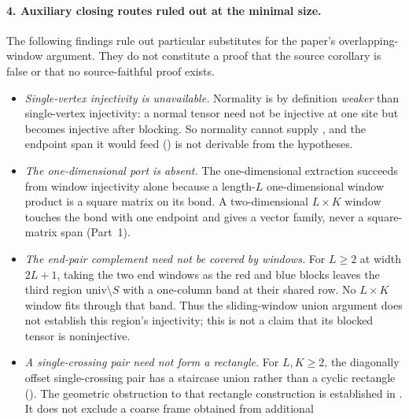 \documentclass{article}
\begin{document}
\paragraph{4. Auxiliary closing routes ruled out at the minimal size.}
The following findings rule out particular substitutes for the paper's
overlapping-window argument.  They do not constitute a proof that the source
corollary is false or that no source-faithful proof exists.
\begin{itemize}
    \item \emph{Single-vertex injectivity is unavailable.} Normality is by
          definition \emph{weaker} than single-vertex injectivity: a normal tensor
          need not be injective at one site but becomes injective after blocking.
          So normality cannot supply
          , and the endpoint span it would
          feed
          () is not derivable from
          the hypotheses.
    \item \emph{The one-dimensional port is absent.} The one-dimensional
          extraction
           succeeds from
          window injectivity alone because a length-$L$ one-dimensional window
          product is a square matrix on its bond. A two-dimensional $L \times K$
          window touches the bond with one endpoint and gives a vector family, never
          a square-matrix span (Part~1).
    \item \emph{The end-pair complement need not be covered by windows.}
          For $L\geq2$ at width $2L+1$, taking the two end windows as the
          red and blue blocks leaves the third region
          $\mathrm{univ}\setminus S$ with a one-column band at their shared
          row. No $L\times K$ window fits through that band. Thus the
          sliding-window union argument does not establish this region's
          injectivity; this is not a claim that its blocked tensor is
          noninjective.
    \item \emph{A single-crossing pair need not form a rectangle.}
          For $L,K\geq2$, the diagonally offset single-crossing pair has a
          staircase union rather than a cyclic rectangle
          ().
          The geometric obstruction to that rectangle construction is
          established in
          .
          It does not exclude a coarse frame obtained from additional

\end{itemize}
\end{document}
